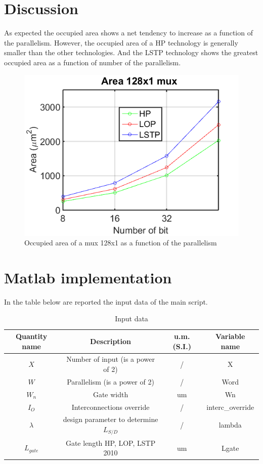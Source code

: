 \section{Discussion}
As expected the occupied area shows a net tendency to increase as a function of the parallelism. However, the occupied area of a HP technology is generally smaller than the other technologies.  And the LSTP technology shows the greatest occupied area as a function of number of the parallelism.
\begin{figure}[!]
	\centering
	\includegraphics[scale =1]{capitoli/Area128to1}
	\caption{Occupied area of a mux 128x1 as a function of the parallelism}
	\label{fig:area}
	
\end{figure} 
\newpage

\section{Matlab implementation}
In the table below are reported the input data of the main script.

\begin{table}[h]
	\begin{center}
		\begin{tabular}{|c|c|c|c|} \hline
			\textbf{Quantity name} & \textbf{Description} & \textbf{u.m. (S.I.)} & \textbf{Variable name} \\ \hline
			$X$ &Number of input (is a power of 2) & / & X \\ 
			$W$ &Parallelism (is a power of 2) & / & Word \\
			$W_n$ &Gate width & um & Wn \\ 
			$I_O$ &Interconnections override & / &interc\_override \\ 
			$\lambda$ &design parameter to determine $L_{S/D}$ & / & lambda\\
			$L_{gate}$ &Gate length HP, LOP, LSTP 2010 & um & Lgate \\	 \hline
		\end{tabular}
	\end{center}
	\caption{Input data}
	\label{tabn}
\end{table}

